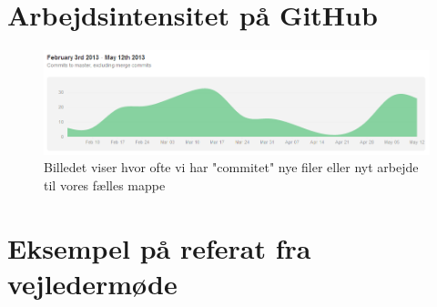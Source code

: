 
\section{Arbejdsintensitet på GitHub}
\label{bilag2}
\begin{figure}[H]
\includegraphics[width=\textwidth]{Indhold/arbejdsintensitet.png}
\caption {Billedet viser hvor ofte vi har "commitet" nye filer eller nyt arbejde til vores fælles mappe}
\label {arbejde}
\end{figure}


\section{Eksempel på referat fra vejledermøde}

